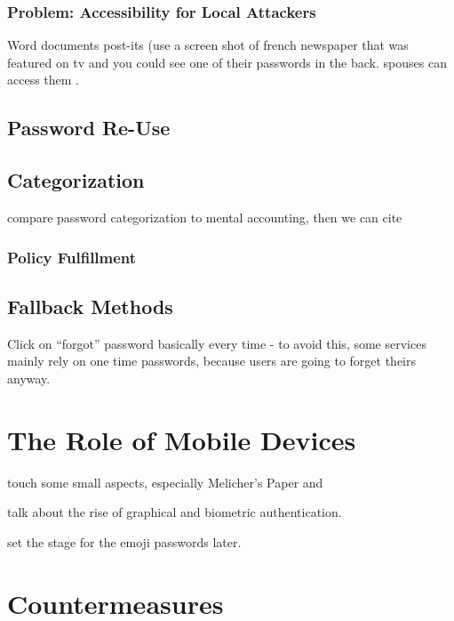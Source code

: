 		\subsubsection{Problem: Accessibility for Local Attackers}
Word documents post-its (use a screen shot of french newspaper that was featured on tv and you could see one of their passwords in the back. spouses can access them .

	\subsection{Password Re-Use}
	
	
	
		\subsection{Categorization}
		compare password categorization to mental accounting, then we can cite \cite{Stockinger2015TowardsBE}
		\subsubsection{Policy Fulfillment}

	\subsection{Fallback Methods}
	Click on ``forgot'' password basically every time - to avoid this, some services mainly rely on one time passwords, because users are going to forget theirs anyway. 

\section{The Role of Mobile Devices}
touch some small aspects, especially Melicher's Paper \cite{Melicher2016UsabilityMobileTextPasswords} and \cite{VonZezschwitz2014HoneyIShrunkTheKeys}
\cite{Haque2014PsychometricsStrongPassword} 

talk about the rise of graphical and biometric authentication. 


set the stage for the emoji passwords later. 



\section{Countermeasures}


